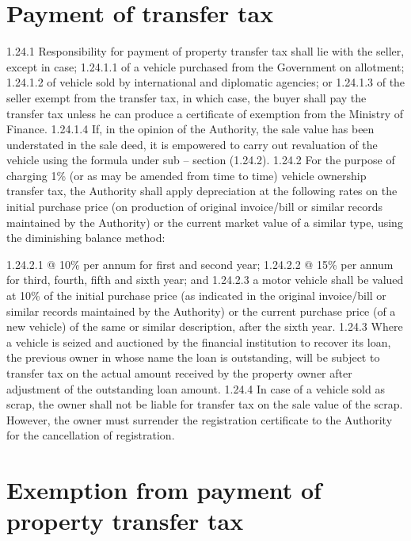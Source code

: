 \documentclass[
]{book}
\begin{document}
\hypertarget{payment-of-transfer-tax}{%
\section{Payment of transfer tax}\label{payment-of-transfer-tax}}

1.24.1 Responsibility for payment of property transfer tax shall lie with the seller, except in case;
1.24.1.1 of a vehicle purchased from the Government on allotment;
1.24.1.2 of vehicle sold by international and diplomatic agencies; or
1.24.1.3 of the seller exempt from the transfer tax, in which case, the buyer shall pay the transfer tax unless he can produce a certificate of exemption from the Ministry of Finance.
1.24.1.4 If, in the opinion of the Authority, the sale value has been understated in the sale deed, it is empowered to carry out revaluation of the vehicle using the formula under sub -- section (1.24.2).
1.24.2 For the purpose of charging 1\% (or as may be amended from time to time) vehicle ownership transfer tax, the Authority shall apply depreciation at the following rates on the initial purchase price (on production of original invoice/bill or similar records maintained by the Authority) or the current market value of a similar type, using the diminishing balance method:

1.24.2.1 @ 10\% per annum for first and second year;
1.24.2.2 @ 15\% per annum for third, fourth, fifth and sixth year; and
1.24.2.3 a motor vehicle shall be valued at 10\% of the initial purchase price (as indicated in the original invoice/bill or similar records maintained by the Authority) or the current purchase price (of a new vehicle) of the same or similar description, after the sixth year.
1.24.3 Where a vehicle is seized and auctioned by the financial institution to recover its loan, the previous owner in whose name the loan is outstanding, will be subject to transfer tax on the actual amount received by the property owner after adjustment of the outstanding loan amount.
1.24.4 In case of a vehicle sold as scrap, the owner shall not be liable for transfer tax on the sale value of the scrap. However, the owner must surrender the registration certificate to the Authority for the cancellation of registration.

\hypertarget{exemption-from-payment-of-property-transfer-tax}{%
\section{Exemption from payment of property transfer tax}\label{exemption-from-payment-of-property-transfer-tax}}
\end{document}

